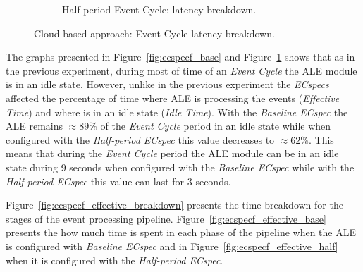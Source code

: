 \begin{figure}[ht!]
\begin{subfigure}{.5\textwidth}
    \caption{Half-period Event Cycle: latency breakdown.}
    \label{fig:ecspecf_half}
  \end{subfigure}
  \caption[Cloud-based approach: event latency breakdown.]{Cloud-based approach: Event Cycle latency breakdown.}
  \label{fig:ecspecf_breakdown}
\end{figure}

The graphs presented in Figure~\ref{fig:ecspecf_base} and Figure~\ref{fig:ecspecf_half} shows that
as in the previous experiment, during most of time of an \textit{Event Cycle} the \gls{ALE} module is
in an idle state. However, unlike in the previous experiment the \textit{ECspecs} affected the percentage of time
where \gls{ALE} is processing the events (\textit{Effective Time}) and where is in an idle state (\textit{Idle Time}).
With the \textit{Baseline ECspec} the \gls{ALE} remains $\approx89\%$ of the \textit{Event Cycle} period
in an idle state while when configured with the \textit{Half-period ECspec} this value decreases to
$\approx62\%$. This means that during the \textit{Event Cycle} period the \gls{ALE} module can be in
an idle state during 9 seconds when configured with the \textit{Baseline ECspec} while with the
\textit{Half-period ECspec} this value can last for 3 seconds.\\

\pagebreak

Figure~\ref{fig:ecspecf_effective_breakdown} presents the time breakdown for the stages of the
event processing pipeline. Figure~\ref{fig:ecspecf_effective_base} presents the how much time is spent
in each phase of the pipeline when the \gls{ALE} is configured with \textit{Baseline ECspec} and in
Figure~\ref{fig:ecspecf_effective_half} when it is configured with the \textit{Half-period ECspec}.\\

